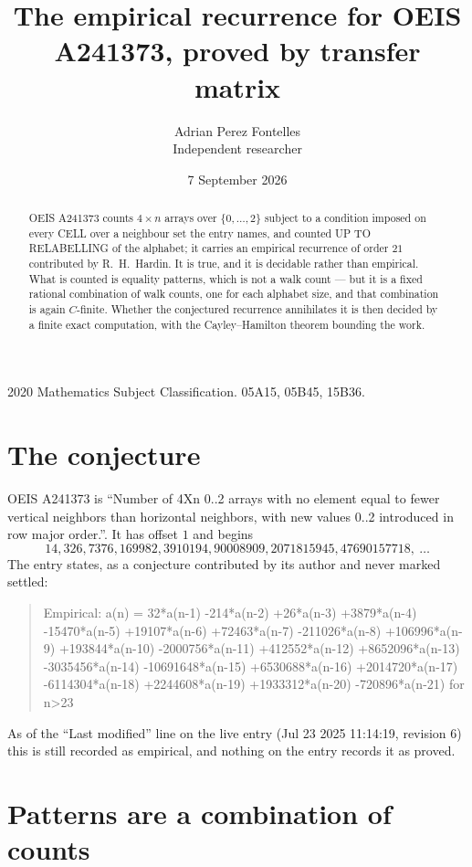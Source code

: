 \documentclass[11pt,a4paper]{article}
\title{The empirical recurrence for OEIS A241373, proved by transfer matrix}
\author{Adrian Perez Fontelles\\ \small Independent researcher}
\date{7 September 2026}
\theoremstyle{plain}
\theoremstyle{definition}
\begin{document}
\maketitle

\begin{abstract}
OEIS A241373 counts $4\times n$ arrays over $\{0,\dots,2\}$ subject to a condition imposed on
every CELL over a neighbour set the entry names, and counted UP TO RELABELLING of the
alphabet; it carries an empirical recurrence of order $21$ contributed by
R.~H.~Hardin. It is true, and it is decidable rather than empirical. What is counted is
equality patterns, which is not a walk count --- but it is a fixed rational combination of
walk counts, one for each alphabet size, and that combination is again $C$-finite. Whether the
conjectured recurrence annihilates it is then decided by a finite exact computation, with the
Cayley--Hamilton theorem bounding the work.
\end{abstract}

\noindent\small 2020 Mathematics Subject Classification. 05A15, 05B45, 15B36.\normalsize

\section{The conjecture}

OEIS A241373 is ``Number of 4Xn 0..2 arrays with no element equal to fewer vertical neighbors than horizontal neighbors, with new values 0..2 introduced in row major order.''. It has offset $1$ and begins
\[
14, 326, 7376, 169982, 3910194, 90008909, 2071815945, 47690157718,\ \dots
\]
The entry states, as a conjecture contributed by its author and never marked settled:
\begin{quote}
Empirical: a(n) = 32*a(n-1) -214*a(n-2) +26*a(n-3) +3879*a(n-4) -15470*a(n-5) +19107*a(n-6) +72463*a(n-7) -211026*a(n-8) +106996*a(n-9) +193844*a(n-10) -2000756*a(n-11) +412552*a(n-12) +8652096*a(n-13) -3035456*a(n-14) -10691648*a(n-15) +6530688*a(n-16) +2014720*a(n-17) -6114304*a(n-18) +2244608*a(n-19) +1933312*a(n-20) -720896*a(n-21) for n>23
\end{quote}
As of the ``Last modified'' line on the live entry (Jul 23 2025 11:14:19, revision 6) this is still
recorded as empirical, and nothing on the entry records it as proved.

\section{Patterns are a combination of counts}
\end{document}
